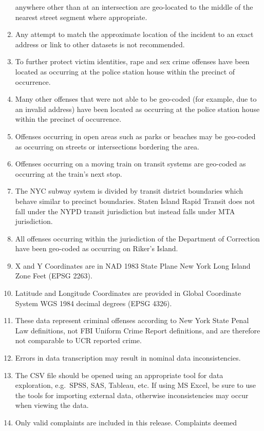 \documentclass[
]{article}
\begin{document}
\begin{enumerate}
  anywhere other than at an intersection are geo-located to the middle
  of the nearest street segment where appropriate.
\item
  Any attempt to match the approximate location of the incident to an
  exact address or link to other datasets is not recommended.
\item
  To further protect victim identities, rape and sex crime offenses have
  been located as occurring at the police station house within the
  precinct of occurrence.
\item
  Many other offenses that were not able to be geo-coded (for example,
  due to an invalid address) have been located as occurring at the
  police station house within the precinct of occurrence.
\item
  Offenses occurring in open areas such as parks or beaches may be
  geo-coded as occurring on streets or intersections bordering the area.
\item
  Offenses occurring on a moving train on transit systems are geo-coded
  as occurring at the train's next stop.
\item
  The NYC subway system is divided by transit district boundaries which
  behave similar to precinct boundaries. Staten Island Rapid Transit
  does not fall under the NYPD transit jurisdiction but instead falls
  under MTA jurisdiction.
\item
  All offenses occurring within the jurisdiction of the Department of
  Correction have been geo-coded as occurring on Riker's Island.
\item
  X and Y Coordinates are in NAD 1983 State Plane New York Long Island
  Zone Feet (EPSG 2263).
\item
  Latitude and Longitude Coordinates are provided in Global Coordinate
  System WGS 1984 decimal degrees (EPSG 4326).
\item
  These data represent criminal offenses according to New York State
  Penal Law definitions, not FBI Uniform Crime Report definitions, and
  are therefore not comparable to UCR reported crime.
\item
  Errors in data transcription may result in nominal data
  inconsistencies.
\item
  The CSV file should be opened using an appropriate tool for data
  exploration, e.g.~SPSS, SAS, Tableau, etc. If using MS Excel, be sure
  to use the tools for importing external data, otherwise
  inconsistencies may occur when viewing the data.
\item
  Only valid complaints are included in this release. Complaints deemed

\end{enumerate}
\end{document}

